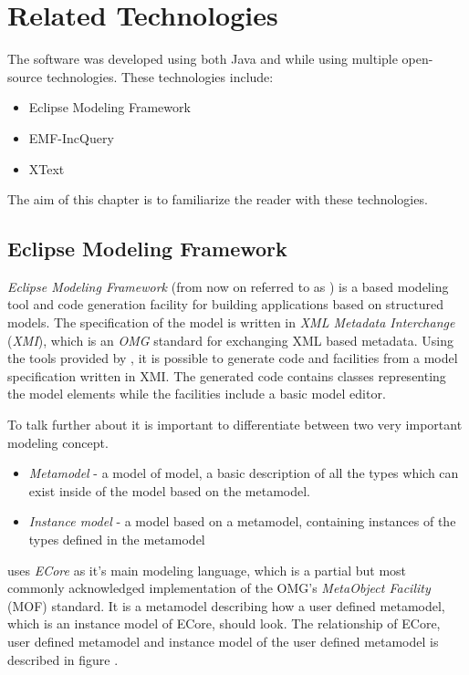 \chapter{Related Technologies}

The software was developed using both Java and \CPP{} while using multiple
open-source technologies. These technologies include:

\begin{itemize}
  \item Eclipse Modeling Framework
  \item EMF-IncQuery
  \item XText
\end{itemize}

The aim of this chapter is to familiarize the reader with these technologies.

\section{Eclipse Modeling Framework}\label{sec:EMF}

\emph{Eclipse Modeling Framework} (from now on referred to as \emph{\EMF{}}) is
a \Java{} based modeling tool and code generation facility for building applications based
on structured models. The specification of the model is written in \emph{XML
Metadata Interchange} (\emph{XMI}), which is an \emph{OMG} standard for
exchanging XML based metadata. Using the tools provided by \EMF{}, it is
possible to generate \Java{} code and facilities from a model specification
written in XMI. The generated code contains \Java{} classes representing the
model elements while the facilities include a basic model editor.

To talk further about \EMF{} it is important to differentiate between two very
important modeling concept.

\begin{itemize}
  \item \emph{Metamodel} - a model of model, a basic description of all the
  types which can exist inside of the model based on the metamodel.
  \item \emph{Instance model} - a model based on a metamodel, containing
  instances of the types defined in the metamodel
\end{itemize}

\EMF{} uses \emph{ECore} as it's main modeling language, which is a partial but most commonly acknowledged implementation of the OMG's
\emph{MetaObject Facility} (MOF) standard. It is a metamodel describing how a
user defined metamodel, which is an instance model of ECore, should look. The
relationship of ECore, user defined metamodel and instance model of the user
defined metamodel is described in figure .

